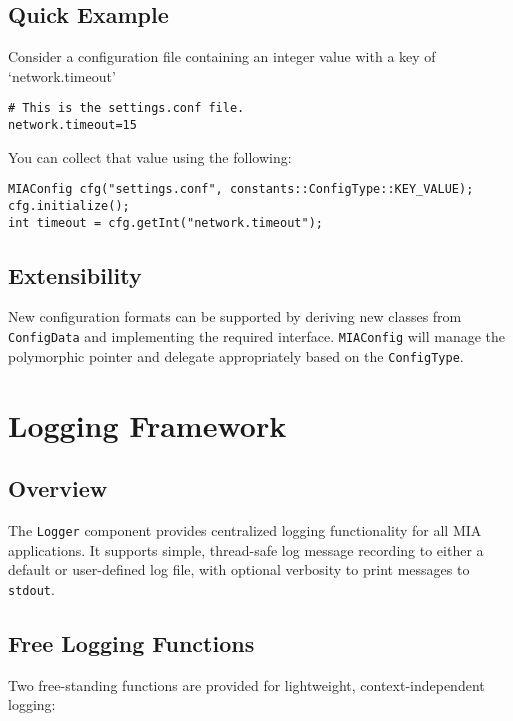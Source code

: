 \subsection{Quick Example}

Consider a configuration file containing an integer value with a key of `network.timeout'
\begin{lstlisting}[style=cppstyle]
# This is the settings.conf file.
network.timeout=15
\end{lstlisting}
You can collect that value using the following: 
\begin{lstlisting}[style=cppstyle]
MIAConfig cfg("settings.conf", constants::ConfigType::KEY_VALUE);
cfg.initialize();
int timeout = cfg.getInt("network.timeout");
\end{lstlisting}

\subsection{Extensibility}

New configuration formats can be supported by deriving new classes from \texttt{ConfigData} and implementing the required interface. \texttt{MIAConfig} will manage the polymorphic pointer and delegate appropriately based on the \texttt{ConfigType}.
























\section{Logging Framework}
\label{sec:logging-Framework}

\subsection{Overview}
The \texttt{Logger} component provides centralized logging functionality for all MIA applications. It supports simple, thread-safe log message recording to either a default or user-defined log file, with optional verbosity to print messages to \texttt{stdout}.

\subsection{Free Logging Functions}
Two free-standing functions are provided for lightweight, context-independent logging:

